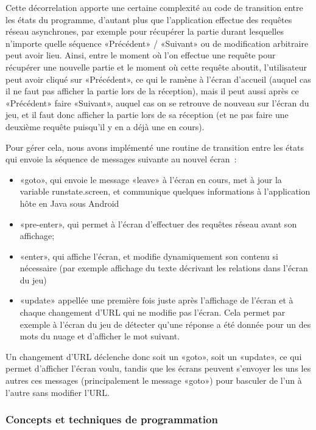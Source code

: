 \documentclass[a4paper,11pt,french]{article}
\begin{document}
Cette décorrelation apporte une certaine complexité au code de transition entre les états du programme, d'autant plus que l'application
effectue des requêtes réseau asynchrones, par exemple pour récupérer la partie durant lesquelles n'importe quelle séquence «Précédent» /
«Suivant» ou de modification arbitraire peut avoir lieu. Ainsi, entre le moment où l'on effectue une requête pour récupérer une nouvelle
partie et le moment où cette requête aboutit, l'utilisateur peut avoir cliqué sur «Précédent», ce qui le ramène à l'écran d'accueil (auquel
cas il ne faut pas afficher la partie lors de la réception), mais il peut aussi après ce «Précédent» faire «Suivant», auquel cas on se
retrouve de nouveau sur l'écran du jeu, et il faut donc afficher la partie lors de sa réception (et ne pas faire une deuxième requête
puisqu'il y en a déjà une en cours).

Pour gérer cela, nous avons implémenté une routine de transition entre les états qui envoie la séquence de messages suivante au nouvel
écran~:
\begin{itemize}
\item «goto», qui envoie le message «leave» à l'écran en cours, met à jour la variable runstate.screen, et communique quelques informations
  à l'application hôte en Java sous Android
\item «pre-enter», qui permet à l'écran d'effectuer des requêtes réseau avant son affichage;
\item «enter», qui affiche l'écran, et modifie dynamiquement son contenu si nécessaire (par exemple affichage du texte décrivant les
  relations dans l'écran du jeu)
\item «update» appellée une première fois juste après l'affichage de l'écran et à chaque changement d'URL qui ne modifie pas l'écran. Cela
  permet par exemple à l'écran du jeu de détecter qu'une réponse a été donnée pour un des mots du nuage et d'afficher le mot suivant.
\end{itemize}

Un changement d'URL déclenche donc soit un «goto», soit un «update», ce qui permet d'afficher l'écran voulu, tandis que les écrans peuvent
s'envoyer les uns les autres ces messages (principalement le message «goto») pour basculer de l'un à l'autre sans modifier l'URL.

\subsubsection{Concepts et techniques de programmation}
\end{document}
